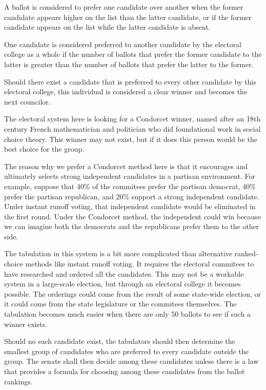 \documentclass{article}
\begin{document}
\begin{quoting}
A ballot is considered to prefer one candidate over another when the former candidate appears higher on the list than the latter candidate, or if the former candidate appears on the list while the latter candidate is absent.

One candidate is considered preferred to another candidate by the electoral college as a whole if the number of ballots that prefer the former candidate to the latter is greater than the number of ballots that prefer the latter to the former.

Should there exist a candidate that is preferred to every other candidate by this electoral college, this individual is considered a clear winner and becomes the next councilor.
\end{quoting}

The electoral system here is looking for a Condorcet winner, named after an 18th century French mathematician and politician who did foundational work in social choice theory. This winner may not exist, but if it does this person would be the best choice for the group.

The reason why we prefer a Condorcet method here is that it encourages and ultimately selects strong independent candidates in a partisan environment. For example, suppose that 40\% of the commitees prefer the partisan democrat, 40\% prefer the partisan republican, and 20\% support a strong independent candidate. Under instant runoff voting, that independent candidate would be eliminated in the first round. Under the Condorcet method, the independent could win because we can imagine both the democrats and the republicans prefer them to the other side.

The tabulation in this system is a bit more complicated than alternative ranked-choice methods like instant runoff voting. It requires the electoral commitees to have researched and ordered all the candidates. This may not be a workable system in a large-scale election, but through an electoral college it becomes possible. The orderings could come from the result of some state-wide election, or it could come from the state legislature or the commitees themselves. The tabulation becomes much easier when there are only 50 ballots to see if such a winner exists.

\begin{quoting}
Should no such candidate exist, the tabulators should then determine the smallest group of candidates who are preferred to every candidate outside the group. The senate shall then decide among these candidates unless there is a law that provides a formula for choosing among these candidates from the ballot rankings.
\end{quoting}
\end{document}
